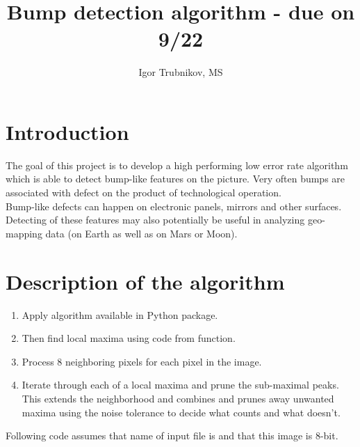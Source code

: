 \documentclass[14pt, letterpaper]{article}
\title{Bump detection algorithm - due on 9/22}
\author{Igor Trubnikov, MS}
\begin{document}
\maketitle
\tableofcontents
\newpage

\section{Introduction}
The goal of this project is to develop a high performing low error rate algorithm which is able to detect bump-like features on the picture. Very often bumps are associated with defect on the product of technological operation.\\
Bump-like defects can happen on electronic panels, mirrors and other surfaces.\\
Detecting of these features may also potentially be useful in analyzing geo-mapping data (on Earth as well as on Mars or Moon).\\

\newpage

\section{Description of the algorithm}

\begin{enumerate}
	\item Apply  algorithm available in Python  package.
	\item Then find local maxima using code from  function.
	\item Process 8 neighboring pixels for each pixel in the image.
	\item Iterate through each of a local maxima and prune the sub-maximal peaks.\\
	This extends the neighborhood and combines and prunes away unwanted maxima using the noise tolerance to decide what counts and what doesn't.
\end{enumerate}

Following code assumes that name of input file is  and that this image is 8-bit.

\newpage
\end{document}
